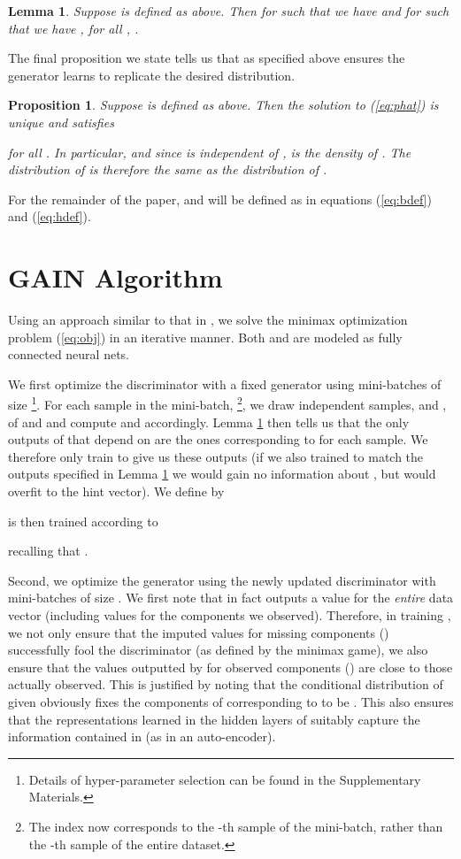 \documentclass{article}
\newtheorem{proposition}{Proposition}
\newtheorem{lemma}{Lemma}
\begin{document}
\begin{lemma} \label{lem:DH}
	Suppose  is defined as above. Then for  such that  we have  and for  such that  we have , for all , .
\end{lemma}

The final proposition we state tells us that  as specified above ensures the generator learns to replicate the desired distribution.

\begin{proposition}	\label{prop:h}
	Suppose  is defined as above. Then the solution to (\ref{eq:phat}) is unique and satisfies
	
	for all . In particular,  and since  is independent of ,  is the density of . The distribution of  is therefore the same as the distribution of .
\end{proposition}

For the remainder of the paper,  and  will be defined as in equations (\ref{eq:bdef}) and (\ref{eq:hdef}).

\section{GAIN Algorithm}\label{sect:gain_algorithm}

Using an approach similar to that in \cite{GAN}, we solve the minimax optimization problem (\ref{eq:obj}) in an iterative manner. Both  and  are modeled as fully connected neural nets.

We first optimize the discriminator  with a fixed generator  using mini-batches of size \footnote{Details of hyper-parameter selection can be found in the Supplementary Materials.}. For each sample in the mini-batch, \footnote{The index  now corresponds to the -th sample of the mini-batch, rather than the -th sample of the entire dataset.}, we draw  independent samples,  and , of  and  and compute  and  accordingly. Lemma \ref{lem:DH} then tells us that the only outputs of  that depend on  are the ones corresponding to  for each sample. We therefore only train  to give us these outputs (if we also trained  to match the outputs specified in Lemma \ref{lem:DH} we would gain no information about , but  would overfit to the hint vector). We define  by

 is then trained according to

recalling that .

Second, we optimize the generator  using the newly updated discriminator  with mini-batches of size . We first note that  in fact outputs a value for the {\em entire} data vector (including values for the components we observed). Therefore, in training , we not only ensure that the imputed values for missing components () successfully fool the discriminator (as defined by the minimax game), we also ensure that the values outputted by  for observed components () are close to those actually observed. This is justified by noting that the conditional distribution of  given  obviously fixes the components of  corresponding to  to be . This also ensures that the representations learned in the hidden layers of  suitably capture the information contained in  (as in an auto-encoder).
\end{document}
